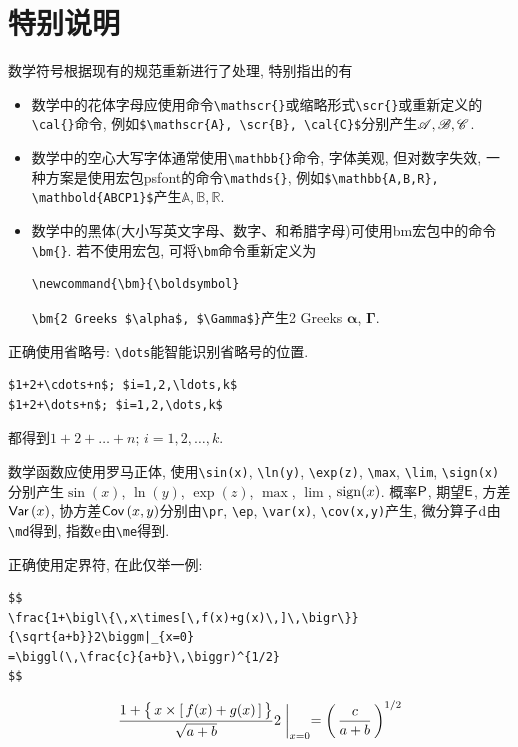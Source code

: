 \documentclass[a4paper,c5size,onecolumn,twoside,cap,Chinese]{APSart}
\begin{document}
\section{特别说明}

\begin{remark}
数学符号根据现有的规范重新进行了处理, 特别指出的有
\begin{itemize}
\item 数学中的花体字母应使用命令\verb|\mathscr{}|或缩略形式\verb|\scr{}|或重新定义的\verb|\cal{}|命令, 例如\verb|$\mathscr{A}, \scr{B}, \cal{C}$|分别产生$\mathscr{A}, \mathscr{B}, \mathscr{C}$.
\item 数学中的空心大写字体通常使用\verb|\mathbb{}|命令, 字体美观, 但对数字失效, 一种方案是使用宏包psfont的命令\verb|\mathds{}|,
    例如\verb|$\mathbb{A,B,R}, \mathbold{ABCP1}$|产生$\mathbb{A,B,R}$.
\item 数学中的黑体(大小写英文字母、数字、和希腊字母)可使用bm宏包中的命令\verb|\bm{}|. 若不使用宏包, 可将\verb|\bm|命令重新定义为
\begin{verbatim}
\newcommand{\bm}{\boldsymbol}
\end{verbatim}
\verb|\bm{2 Greeks $\alpha$, $\Gamma$}|产生2 Greeks $\bm{\alpha}$, $\bm{\Gamma}$.
\end{itemize}
\end{remark}

\begin{remark}
正确使用省略号: \verb|\dots|能智能识别省略号的位置.
\begin{verbatim}
$1+2+\cdots+n$; $i=1,2,\ldots,k$
$1+2+\dots+n$; $i=1,2,\dots,k$
\end{verbatim}
都得到$1+2+\dots+n$; $i=1,2,\dots,k$.
\end{remark}

\begin{remark}
数学函数应使用罗马正体, 使用\verb|\sin(x)|, \verb|\ln(y)|, \verb|\exp(z)|, \verb|\max|, \verb|\lim|, \verb|\sign(x)|分别产生$\sin(x)$, $\ln(y)$, $\exp(z)$, $\max$, $\lim$, $\mathrm{sign}(x)$. 概率$\hbox{\sf P}$, 期望$\hbox{\sf E}$, 方差$\hbox{\sf Var}\,(x)$, 协方差$\hbox{\sf Cov}\,(x,y)$分别由\verb|\pr|, \verb|\ep|, \verb|\var(x)|, \verb|\cov(x,y)|产生, 微分算子$\mathrm{d}$由\verb|\md|得到, 指数$\mathrm{e}$由\verb|\me|得到.
\end{remark}

\begin{remark}
正确使用定界符, 在此仅举一例:
\begin{verbatim}
$$
\frac{1+\bigl\{\,x\times[\,f(x)+g(x)\,]\,\bigr\}}{\sqrt{a+b}}2\biggm|_{x=0}
=\biggl(\,\frac{c}{a+b}\,\biggr)^{1/2}
$$
\end{verbatim}
$$
\frac{1+\bigl\{\,x\times[\,f(x)+g(x)\,]\,\bigr\}}{\sqrt{a+b}}2\biggm|_{x=0}
=\biggl(\,\frac{c}{a+b}\,\biggr)^{1/2}
$$
\end{remark}	
\end{document}

